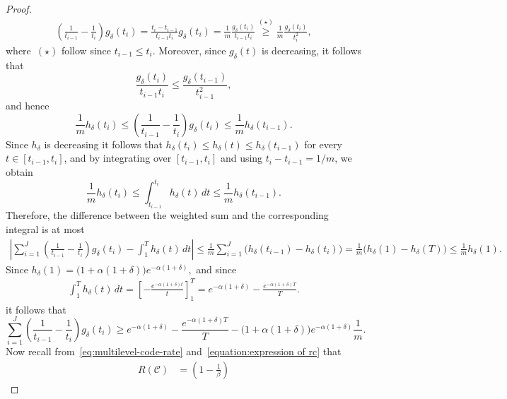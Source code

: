 \documentclass[journal,letterpaper,onecolumn,11pt]{IEEEtran}
\newcommand{\cC}{\mathcal{C}}
\begin{document}
\begin{proof}
\[
\begin{aligned}
\left(
\frac{1}{t_{i-1}}-\frac{1}{t_i}
\right)g_\delta(t_i)
=
\frac{t_i-t_{i-1}}{t_{i-1}t_i}g_\delta(t_i)=
\frac{1}{m}\frac{g_\delta(t_i)}{t_{i-1}t_i}\overset{(\star)}{\ge}\frac{1}{m}\frac{g_\delta(t_i)}{t_i^2},
\end{aligned}
\]
where~$(\star)$ follow since \(t_{i-1}\leq t_i\).
Moreover, since \(g_\delta(t)\) is decreasing, it follows that
\[
\frac{g_\delta(t_i)}{t_{i-1}t_i}
\leq
\frac{g_\delta(t_{i-1})}{t_{i-1}^2},
\]
and hence
\[
\frac{1}{m}h_\delta(t_i)
\leq
\left(
\frac{1}{t_{i-1}}-\frac{1}{t_i}
\right)
g_\delta(t_i)
\leq
\frac{1}{m}h_\delta(t_{i-1}).
\]
Since \(h_\delta\) is decreasing it follows that $h_\delta(t_i)\leq h_\delta(t)\leq h_\delta(t_{i-1})$ for every \(t\in[t_{i-1},t_i]\), and by integrating over \([t_{i-1},t_i]\) and using \(t_i-t_{i-1}=1/m\), we obtain
\[
\frac{1}{m}h_\delta(t_i)
\leq
\int_{t_{i-1}}^{t_i}h_\delta(t)\,dt
\leq
\frac{1}{m}h_\delta(t_{i-1}).
\]
Therefore, the difference
between the weighted sum and the corresponding integral is at most
\[
\begin{aligned}
\left|
\sum_{i=1}^{J}
\left(
\frac{1}{t_{i-1}}-\frac{1}{t_i}
\right)
g_\delta(t_i)
-
\int_1^T h_\delta(t)\,dt
\right|\leq
\frac{1}{m}
\sum_{i=1}^{J}
\bigl(h_\delta(t_{i-1})-h_\delta(t_i)\bigr)=
\frac{1}{m}
\bigl(h_\delta(1)-h_\delta(T)\bigr)\leq
\frac{1}{m}
h_\delta(1).
\end{aligned}
\]
Since
$
h_\delta(1)
=
\bigl(1+\alpha(1+\delta)\bigr)e^{-\alpha(1+\delta)},
$
and since
\begin{align*}
\int_1^T h_\delta(t)\,dt
=
\left[
-\frac{e^{-\alpha(1+\delta)t}}{t}
\right]_{1}^{T}=
e^{-\alpha(1+\delta)}
-
\frac{e^{-\alpha(1+\delta)T}}{T}.
\end{align*}
it follows that
\begin{equation}\label{eq:integral}
    \sum_{i=1}^{J}
\left(
\frac{1}{t_{i-1}}-\frac{1}{t_i}
\right)
g_\delta(t_i)\geq
e^{-\alpha(1+\delta)}
-
\frac{e^{-\alpha(1+\delta)T}}{T}
-
\bigl(1+\alpha(1+\delta)\bigr)e^{-\alpha(1+\delta)}
\frac{1}{m}.
\end{equation}
Now recall from~\eqref{eq:multilevel-code-rate} and~\eqref{equation:expression of rc} that
\[
\begin{aligned}
R(\cC)
&=
\left(1-\frac{1}{\beta}\right)

\end{aligned}\]
\end{proof}
\end{document}
